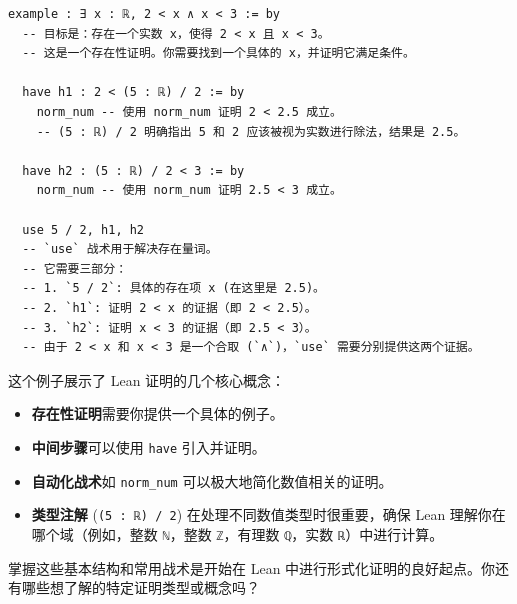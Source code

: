 \documentclass{amsart}
\theoremstyle{plain}
\theoremstyle{definition}
\theoremstyle{remark}
\begin{document}
\begin{lstlisting}[language=lean]
example : ∃ x : ℝ, 2 < x ∧ x < 3 := by
  -- 目标是：存在一个实数 x，使得 2 < x 且 x < 3。
  -- 这是一个存在性证明。你需要找到一个具体的 x，并证明它满足条件。

  have h1 : 2 < (5 : ℝ) / 2 := by
    norm_num -- 使用 norm_num 证明 2 < 2.5 成立。
    -- (5 : ℝ) / 2 明确指出 5 和 2 应该被视为实数进行除法，结果是 2.5。

  have h2 : (5 : ℝ) / 2 < 3 := by
    norm_num -- 使用 norm_num 证明 2.5 < 3 成立。

  use 5 / 2, h1, h2
  -- `use` 战术用于解决存在量词。
  -- 它需要三部分：
  -- 1. `5 / 2`: 具体的存在项 x (在这里是 2.5)。
  -- 2. `h1`: 证明 2 < x 的证据（即 2 < 2.5）。
  -- 3. `h2`: 证明 x < 3 的证据（即 2.5 < 3）。
  -- 由于 2 < x 和 x < 3 是一个合取 (`∧`)，`use` 需要分别提供这两个证据。
\end{lstlisting}
这个例子展示了 Lean 证明的几个核心概念：

\begin{itemize}
	\item \textbf{存在性证明}需要你提供一个具体的例子。
	\item \textbf{中间步骤}可以使用 \lstinline{have} 引入并证明。
	\item \textbf{自动化战术}如 \lstinline{norm_num} 可以极大地简化数值相关的证明。
	\item \textbf{类型注解} (\lstinline{(5 : ℝ) / 2}) 在处理不同数值类型时很重要，确保 Lean 理解你在哪个域（例如，整数 \lstinline{ℕ}，整数 \lstinline{ℤ}，有理数 \lstinline{ℚ}，实数 \lstinline{ℝ}）中进行计算。
\end{itemize}

掌握这些基本结构和常用战术是开始在 Lean 中进行形式化证明的良好起点。你还有哪些想了解的特定证明类型或概念吗？
\end{document}
